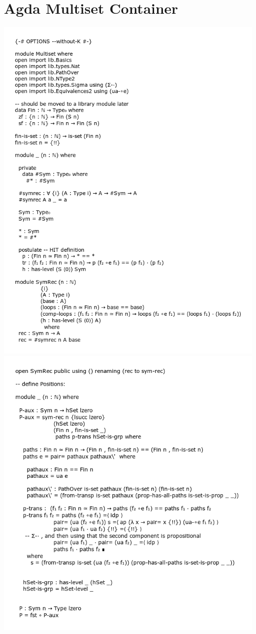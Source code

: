 \documentclass[12pt]{report}
\begin{document}
\section{Agda Multiset Container}
\includegraphics[scale=0.7]{code1.png}
\newpage
\includegraphics[scale=0.7]{code2.png}
\end{document}
